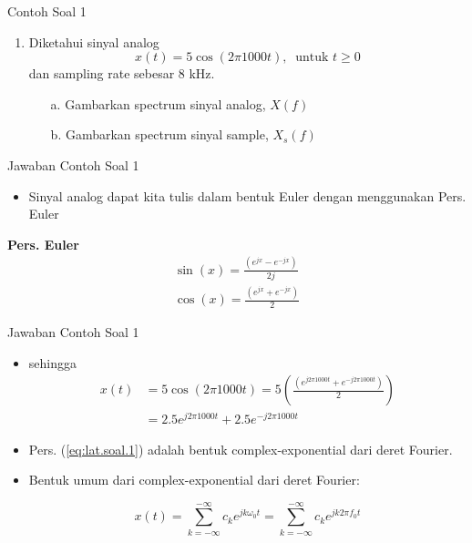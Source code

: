 \documentclass[pdflatex,compress,mathserif]{beamer}
\begin{document}
\begin{frame}{Contoh Soal 1}
    \begin{enumerate}
        \item Diketahui sinyal analog
        \begin{equation*}
            x(t) = 5 \cos (2 \pi 1000 t),~\text{ untuk } t \geq 0
        \end{equation*}
        dan sampling rate sebesar 8 kHz.
        \begin{enumerate}
            \item[a.] Gambarkan spectrum sinyal analog, $X(f)$
            \item[b.] Gambarkan spectrum sinyal sample, $X_s(f)$
        \end{enumerate}
    \end{enumerate}
\end{frame}

\begin{frame}{Jawaban Contoh Soal 1}
    \begin{itemize}
        \item Sinyal analog dapat kita tulis dalam bentuk Euler dengan menggunakan Pers. Euler
    \end{itemize}
    \begin{framed}
    \textbf{Pers. Euler}
        \begin{align}
            \sin(x) = \frac{(e^{jx} - e^{-jx})}{2j} \\
            \cos(x) = \frac{(e^{jx} + e^{-jx})}{2}
        \end{align}
    \end{framed}
\end{frame}

\begin{frame}{Jawaban Contoh Soal 1}
    \begin{itemize}
        \item sehingga
        \begin{align}
            x(t) &= 5 \cos (2 \pi 1000 t) = 5 \left( \frac{(e^{j2\pi 1000t} + e^{-j2\pi 1000t})}{2} \right) \\
            &= 2.5 e^{j2 \pi 1000t} + 2.5 e^{-j2 \pi 1000t}
            \label{eq:lat.soal.1}
        \end{align}
        \item Pers. (\ref{eq:lat.soal.1}) adalah bentuk complex-exponential dari deret Fourier.
        \item Bentuk umum dari complex-exponential dari deret Fourier:
        \begin{framed}
            \begin{equation*}
                x(t) = \sum_{k=-\infty}^{-\infty} c_k e^{jk\omega_0 t} = \sum_{k=-\infty}^{-\infty} c_k e^{jk 2\pi f_0 t}
            \end{equation*}
        \end{framed}
    \end{itemize}
\end{frame}
\end{document}

